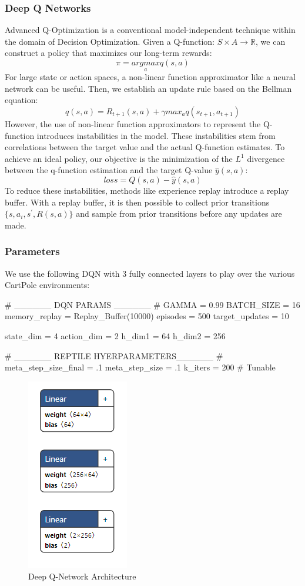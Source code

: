 \documentclass[runningheads]{llncs}
\begin{document}
\subsubsection{Deep Q Networks}
Advanced Q-Optimization is a conventional model-independent technique within the domain of Decision Optimization. Given a Q-function: $S \times A \rightarrow \mathbb{R}$, we can construct a policy that maximizes our long-term rewards:
$$\pi = \underset{a}{argmax}q(s,a)$$  
For large state or action spaces, a non-linear function approximator like a neural network can be useful. Then, we establish an update rule based on the Bellman equation: 
$$q(s,a) = R_{t+1}(s,a) + \gamma max_{a}q(s_{t+1}, a_{t+1})$$
However, the use of non-linear function approximators to represent the Q-function introduces instabilities in the model. These instabilities stem from correlations between the target value and the actual Q-function estimates. To achieve an ideal policy, our objective is the minimization of the $L^1$ divergence between the q-function estimation and the target Q-value $\hat{y}(s,a)$:
$$loss = Q(s,a) - \hat{y}(s,a)$$  
To reduce these instabilities, methods like experience replay introduce a replay buffer. With a replay buffer, it is then possible to collect prior transitions $\{s, a_i, s^{'}, R(s,a)\}$  and sample from prior transitions before any updates are made. 

\subsubsection{Parameters} 
We use the following DQN with 3 fully connected layers to play over the various CartPole environments: 
\begin{verbbox}[\small]
# ______ DQN PARAMS ______ # 
GAMMA = 0.99 
BATCH_SIZE = 16
memory_replay = Replay_Buffer(10000) 
episodes = 500 
target_updates = 10

state_dim = 4
action_dim = 2 
h_dim1 = 64
h_dim2 = 256

# ______ REPTILE HYERPARAMETERS______ # 
meta_step_size_final = .1
meta_step_size = .1 
k_iters = 200 # Tunable  
\end{verbbox}
    \begin{figure}[h!]
  \centering
  \theverbbox\qquad
  \includegraphics[scale=.5]{architecture_diagram.png}
  \caption{Deep Q-Network Architecture}
\end{figure}
\end{document}
